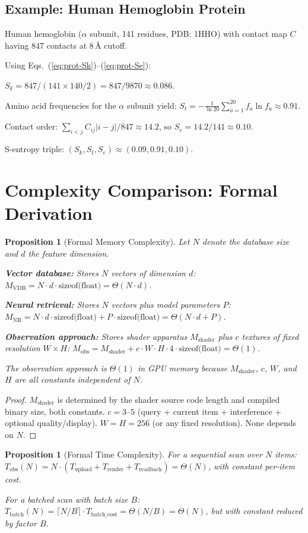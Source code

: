 \documentclass[11pt,twocolumn,a4paper]{article}
\newtheorem{proposition}[theorem]{Proposition}
\newcommand{\Sk}{S_k}
\newcommand{\St}{S_t}
\newcommand{\Se}{S_e}
\newcommand{\Mshader}{M_{\mathrm{shader}}}
\begin{document}
\subsection{Example: Human Hemoglobin Protein}

Human hemoglobin ($\alpha$ subunit, 141 residues, PDB: 1HHO) with
contact map $C$ having 847 contacts at 8\,\AA{} cutoff.

Using Eqs.~(\ref{eq:prot-Sk})--(\ref{eq:prot-Se}):

$\Sk = 847 / (141 \times 140/2) = 847/9870 \approx 0.086$.

Amino acid frequencies for the $\alpha$ subunit yield:
$\St = -\frac{1}{\ln 20} \sum_{a=1}^{20} f_a \ln f_a \approx 0.91$.

Contact order: $\sum_{i<j} C_{ij}|i-j|/847 \approx 14.2$, so
$\Se = 14.2/141 \approx 0.10$.

S-entropy triple: $(\Sk, \St, \Se) \approx (0.09, 0.91, 0.10)$.


\section{Complexity Comparison: Formal Derivation}
\label{app:complexity}

\begin{proposition}[Formal Memory Complexity]
\label{prop:formal-memory}
Let $N$ denote the database size and $d$ the feature dimension.

\textbf{Vector database:}
Stores $N$ vectors of dimension $d$:
$M_{\mathrm{VDB}} = N \cdot d \cdot \text{sizeof(float)}
= \Theta(N \cdot d)$.

\textbf{Neural retrieval:}
Stores $N$ vectors plus model parameters $P$:
$M_{\mathrm{NR}} = N \cdot d \cdot \text{sizeof(float)} + P \cdot
\text{sizeof(float)} = \Theta(N \cdot d + P)$.

\textbf{Observation approach:}
Stores shader apparatus $\Mshader$ plus $c$ textures of fixed
resolution $W \times H$:
$M_{\mathrm{obs}} = \Mshader + c \cdot W \cdot H \cdot 4 \cdot
\text{sizeof(float)} = \Theta(1)$.

The observation approach is $\Theta(1)$ in GPU memory because
$\Mshader$, $c$, $W$, and $H$ are all constants independent of $N$.
\end{proposition}

\begin{proof}
$\Mshader$ is determined by the shader source code length and
compiled binary size, both constants. $c = 3$--$5$ (query +
current item + interference + optional quality/display). $W = H = 256$
(or any fixed resolution). None depends on $N$.
\end{proof}

\begin{proposition}[Formal Time Complexity]
\label{prop:formal-time}
For a sequential scan over $N$ items:
$T_{\mathrm{obs}}(N) = N \cdot (T_{\mathrm{upload}} +
T_{\mathrm{render}} + T_{\mathrm{readback}}) = \Theta(N)$,
with constant per-item cost.

For a batched scan with batch size $B$:
$T_{\mathrm{batch}}(N) = \lceil N/B \rceil \cdot T_{\mathrm{batch\_cost}}
= \Theta(N/B) = \Theta(N)$, but with constant reduced by factor $B$.
\end{proposition}
\end{document}
